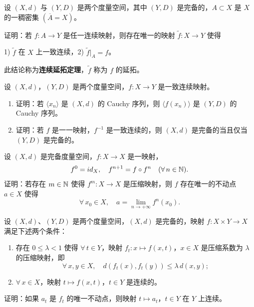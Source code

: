 \begin{exercise}
	\item 设 $(X,d)$ 与 $(Y,D)$ 是两个度量空间，其中 $(Y,D)$ 是完备的，$A\subset X$ 是 $X$ 的一稠密集 $(\overline{A}=X)$。

	证明：若 $f:A\to Y$ 是任一连续映射，则存在唯一的映射 $\widetilde{f}:X\to Y$ 使得

	1) $\widetilde{f}$ 在 $X$ 上一致连续，2) $\widetilde{f}|_A=f$。

	此结论称为\textbf{连续延拓定理}，$\widetilde{f}$ 称为 $f$ 的延拓。
\end{exercise}

\begin{exercise}
	\item 设 $(X,d)$，$(Y,D)$ 是两个度量空间，$f:X\to Y$ 是一致连续映射。
	\begin{enumerate}[label=\arabic*)]
		\item 证明：若 $\langle x_n\rangle$ 是 $(X,d)$ 的 Cauchy 序列，则 $\langle f(x_n)\rangle$ 是 $(Y,D)$ 的 Cauchy 序列。
		\item 证明：若 $f$ 是一一映射，$f^{-1}$ 是一致连续的，则 $(X,d)$ 是完备的当且仅当 $(Y,D)$ 是完备的。
	\end{enumerate}
\end{exercise}

\begin{exercise}
	\item 设 $(X,d)$ 是完备度量空间，$f:X\to X$ 是一映射，
	\[f^0=id_X,\quad f^{n+1}=f\circ f^n\quad(\forall\,n\in\mathbb{N}).\]
	证明：若存在 $m\in\mathbb{N}$ 使得 $f^m:X\to X$ 是压缩映射，则 $f$ 存在唯一的不动点 $a\in X$ 使得
	\[\forall\,x_0\in X,\quad a=\lim_{n\to+\infty}f^n(x_0).\]
\end{exercise}

\begin{exercise}
	\item 设 $(X,d)$、$(Y,D)$ 是两个度量空间，$(X,d)$ 是完备的，映射 $f:X\times Y\to X$ 满足下述两个条件：
	\begin{enumerate}[label=\arabic*)]
		\item 存在 $0\leqslant\lambda<1$ 使得 $\forall\,t\in Y$，映射 $f_t:x\longmapsto f(x,t)$，$x\in X$ 是压缩系数为 $\lambda$ 的压缩映射，即
		\[\forall\,x,y\in X,\quad d(f_t(x),f_t(y))\leqslant\lambda\,d(x,y);\]
		\item $\forall\,x\in X$，映射 $t\longmapsto f(x,t)$，$t\in Y$ 是连续的。
	\end{enumerate}
	证明：如果 $a_t$ 是 $f_t$ 的唯一不动点，则映射 $t\longmapsto a_t$，$t\in Y$ 在 $Y$ 上连续。
\end{exercise}

